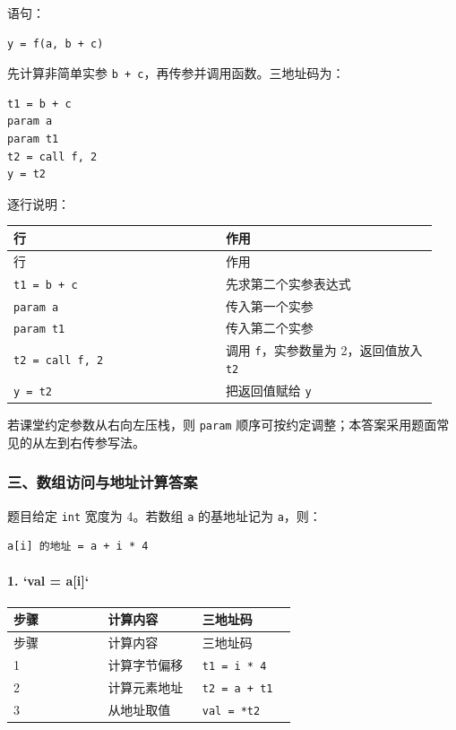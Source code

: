 \documentclass[UTF8]{ctexart}
\begin{document}
语句：

\begin{Verbatim}[fontsize=\small,breaklines=true]
y = f(a, b + c)
\end{Verbatim}

先计算非简单实参 \texttt{b + c}，再传参并调用函数。三地址码为：

\begin{Verbatim}[fontsize=\small,breaklines=true]
t1 = b + c
param a
param t1
t2 = call f, 2
y = t2
\end{Verbatim}

逐行说明：

\begin{longtable}{|p{0.47\linewidth}|p{0.47\linewidth}|}
\hline
行 & 作用 \\
\hline
\endfirsthead
行 & 作用 \\
\hline
\endhead
\texttt{t1 = b + c} & 先求第二个实参表达式 \\
\hline
\texttt{param a} & 传入第一个实参 \\
\hline
\texttt{param t1} & 传入第二个实参 \\
\hline
\texttt{t2 = call f, 2} & 调用 \texttt{f}，实参数量为 2，返回值放入 \texttt{t2} \\
\hline
\texttt{y = t2} & 把返回值赋给 \texttt{y} \\
\hline
\end{longtable}

若课堂约定参数从右向左压栈，则 \texttt{param} 顺序可按约定调整；本答案采用题面常见的从左到右传参写法。

\subsubsection*{三、数组访问与地址计算答案}

题目给定 \texttt{int} 宽度为 4。若数组 \texttt{a} 的基地址记为 \texttt{a}，则：

\begin{Verbatim}[fontsize=\small,breaklines=true]
a[i] 的地址 = a + i * 4
\end{Verbatim}

\paragraph*{1. `val = a[i]`}

\begin{longtable}{|p{0.31\linewidth}|p{0.31\linewidth}|p{0.31\linewidth}|}
\hline
步骤 & 计算内容 & 三地址码 \\
\hline
\endfirsthead
步骤 & 计算内容 & 三地址码 \\
\hline
\endhead
1 & 计算字节偏移 & \texttt{t1 = i * 4} \\
\hline
2 & 计算元素地址 & \texttt{t2 = a + t1} \\
\hline
3 & 从地址取值 & \texttt{val = *t2} \\
\hline
\end{longtable}
\end{document}
